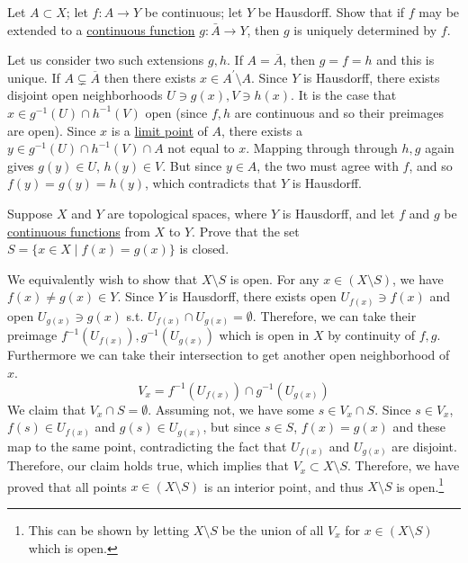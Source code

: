   \begin{exercise}[Munkres 18.13]
    Let $A \subset X$; let $f : A \to Y$ be continuous; let $Y$ be Hausdorff. Show that if $f$ may be extended to a \hyperref[def:continuous_func]{continuous function} $g : \bar{A} \to Y$, then $g$ is uniquely determined by $f$.
  \end{exercise}
  \begin{solution}
    Let us consider two such extensions $g, h$. If $A = \overline{A}$, then $g = f = h$ and this is unique. If $A \subsetneq \overline{A}$ then there exists $x \in A^\prime \setminus A$. Since $Y$ is Hausdorff, there exists disjoint open neighborhoods $U \ni g(x), V \ni h(x)$. It is the case that $x \in g^{-1}(U) \cap h^{-1} (V)$ open (since $f, h$ are continuous and so their preimages are open). Since $x$ is a \hyperref[def:limit-point]{limit point} of $A$, there exists a $y \in g^{-1} (U) \cap h^{-1} (V) \cap A$ not equal to $x$. Mapping through through $h, g$ again gives $g(y) \in U$, $h(y) \in V$. But since $y \in A$, the two must agree with $f$, and so $f(y) = g(y) = h(y)$, which contradicts that $Y$ is Hausdorff. 
  \end{solution}

  \begin{exercise}
    Suppose $X$ and $Y$ are topological spaces, where $Y$ is Hausdorff, and let $f$ and $g$ be \hyperref[def:continuous_func]{continuous functions} from $X$ to $Y$. Prove that the set $S = \{x \in X \mid f(x) = g(x)\}$ is closed.
  \end{exercise}
  \begin{solution}
    We equivalently wish to show that $X \setminus S$ is open. For any $x \in (X \setminus S)$, we have $f(x) \neq g(x) \in Y$. Since $Y$ is Hausdorff, there exists open $U_{f(x)} \ni f(x)$ and open $U_{g(x)} \ni g(x)$ s.t. $U_{f(x)} \cap U_{g(x)} = \emptyset$. Therefore, we can take their preimage $f^{-1} (U_{f(x)}), g^{-1} (U_{g(x)})$ which is open in $X$ by continuity of $f, g$. Furthermore we can take their intersection to get another open neighborhood of $x$. 
    \begin{equation}
     V_x = f^{-1} (U_{f(x)}) \cap g^{-1} (U_{g(x)}) 
    \end{equation}
    We claim that $V_x \cap S = \emptyset$. Assuming not, we have some $s \in V_x \cap S$. Since $s \in V_x$, $f(s) \in U_{f(x)}$ and $g(s) \in U_{g(x)}$, but since $s \in S$, $f(x) = g(x)$ and these map to the same point, contradicting the fact that $U_{f(x)}$ and $U_{g(x)}$ are disjoint. Therefore, our claim holds true, which implies that $V_x \subset X \setminus S$. Therefore, we have proved that all points $x \in (X \setminus S)$ is an interior point, and thus $X \setminus S$ is open.\footnote{This can be shown by letting $X \setminus S$ be the union of all $V_x$ for $x \in (X \setminus S)$ which is open.}
  \end{solution}


